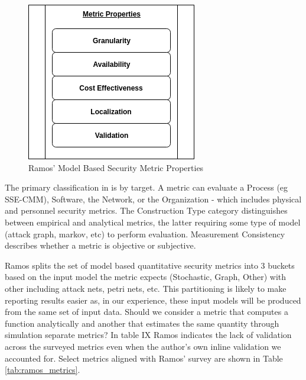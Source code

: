 \begin{figure}[ht]
\centering
\includegraphics[width=.35\linewidth]{resource/img/ch_background/cybok_metrics/ramos_metric_properties.png}
\caption{Ramos’ Model Based Security Metric Properties\cite{Ramos_Lazar_Filho_Rodrigues_2017}}
\label{fig:background:ramos_metric_props}
\end{figure} 

The primary classification in \cite{Ramos_Lazar_Filho_Rodrigues_2017} is by target. A metric can evaluate a Process (eg SSE-CMM), Software, the Network, or the Organization - which includes physical and personnel security metrics. The Construction Type category distinguishes between empirical and analytical metrics, the latter requiring some type of model (attack graph, markov, etc)  to perform evaluation. Measurement Consistency describes whether a metric is objective or subjective. 

Ramos splits the set of model based quantitative security metrics into 3 buckets based on the input model the metric expects (Stochastic, Graph, Other) with other including attack nets, petri nets, etc. This partitioning is likely to make reporting results easier as, in our experience, these input models will be produced from the same set of input data. Should we consider a metric that computes a function analytically and another that estimates the same quantity through simulation separate metrics? In table IX\cite{Ramos_Lazar_Filho_Rodrigues_2017} Ramos indicates the lack of validation across the surveyed metrics even when the author’s own inline validation we accounted for. Select metrics aligned with Ramos' survey are shown in Table \ref{tab:ramos_metrics}.


